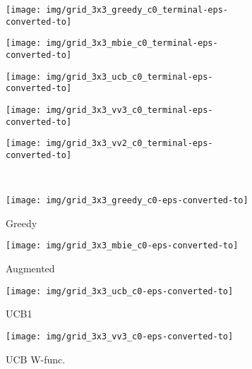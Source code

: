 \documentclass{article}
\begin{document}
\begin{figure}[t]
	\centering 
		\begin{subfigure}[t]{.18\linewidth} 
	\centering 
	\texttt{[image: img/grid\_3x3\_greedy\_c0\_terminal-eps-converted-to]}
\end{subfigure}
\hfill
\begin{subfigure}[t]{.18\linewidth} 
	\centering 
	\texttt{[image: img/grid\_3x3\_mbie\_c0\_terminal-eps-converted-to]}
\end{subfigure}
\hfill
\begin{subfigure}[t]{.18\linewidth} 
	\centering 
	\texttt{[image: img/grid\_3x3\_ucb\_c0\_terminal-eps-converted-to]}
\end{subfigure} 
\hfill
\begin{subfigure}[t]{.18\linewidth} 
	\centering 
	\texttt{[image: img/grid\_3x3\_vv3\_c0\_terminal-eps-converted-to]}
\end{subfigure}
\hfill
\begin{subfigure}[t]{.18\linewidth} 
	\centering 
	\texttt{[image: img/grid\_3x3\_vv2\_c0\_terminal-eps-converted-to]}
\end{subfigure}
\\[0.5em]
	\begin{subfigure}[t]{.18\linewidth} 
		\centering 
		\texttt{[image: img/grid\_3x3\_greedy\_c0-eps-converted-to]}
		\caption{\label{fig:toy_greedy_0}Greedy}
	\end{subfigure}
	\hfill
	\begin{subfigure}[t]{.18\linewidth} 
		\centering 
		\texttt{[image: img/grid\_3x3\_mbie\_c0-eps-converted-to]}
		\caption{\label{fig:toy_mbie_0}Augmented}
	\end{subfigure}
	\hfill
	\begin{subfigure}[t]{.18\linewidth} 
		\centering 
		\texttt{[image: img/grid\_3x3\_ucb\_c0-eps-converted-to]}
		\caption{\label{fig:toy_ucb_0}UCB1}
	\end{subfigure} 
	\hfill
	\begin{subfigure}[t]{.18\linewidth} 
		\centering 
		\texttt{[image: img/grid\_3x3\_vv3\_c0-eps-converted-to]}
		\caption{\label{fig:toy_vv3_0}UCB W-func.}
	\end{subfigure}
	\hfill
	\begin{subfigure}[t]{.18\linewidth} 

\end{subfigure}
\end{figure}
\end{document}
